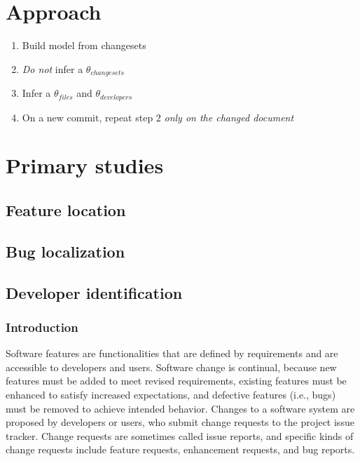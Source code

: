 \section{Approach}\label{approach}

\begin{enumerate}
\def\labelenumi{\arabic{enumi}.}
\itemsep1pt\parskip0pt
\item
  Build model from changesets
\item
  \emph{Do not} infer a $\theta_{changesets}$
\item
  Infer a $\theta_{files}$ and $\theta_{developers}$
\item
  On a new commit, repeat step 2 \emph{only on the changed document}
\end{enumerate}

\section{Primary studies}\label{primary-studies}

\subsection{Feature location}\label{feature-location-study}

\subsection{Bug localization}\label{bug-localization-study}

\subsection{Developer
identification}\label{developer-identification-study}

\subsubsection{Introduction}\label{introduction}

Software features are functionalities that are defined by requirements
and are accessible to developers and users. Software change is
continual, because new features must be added to meet revised
requirements, existing features must be enhanced to satisfy increased
expectations, and defective features (i.e., bugs) must be removed to
achieve intended behavior. Changes to a software system are proposed by
developers or users, who submit change requests to the project issue
tracker. Change requests are sometimes called issue reports, and
specific kinds of change requests include feature requests, enhancement
requests, and bug reports.

